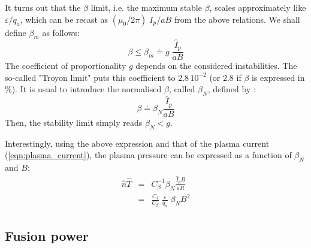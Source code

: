 It turns out that the $\beta$ limit, i.e. the maximum stable $\beta$, scales approximately like $\varepsilon/q_a$, which can be recast as $(\mu_0/2\pi)\; I_p/aB$ from the above relations. We shall define $\beta_m$ as follows:
\begin{equation}
  \beta \leqslant \beta_m \doteq g\; \frac{\hat I_p}{a B}
\end{equation}
The coefficient of proportionality $g$ depends on the considered instabilities. The so-called "Troyon limit" \cite{Troyon1984} puts this coefficient to $2.8\, 10^{-2}$ (or 2.8 if $\beta$ is expressed in $\%$).
It is usual to introduce the normalised $\beta$, called $\beta_N$, defined by \cite[eq.(13.146)]{Freidberg2007}:
\begin{equation}
    \beta \doteq \beta_N \frac{\hat I_p}{a B}
\end{equation}
Then, the stability limit simply reads $\beta_N <g$.

Interestingly, using the above expression and that of the plasma current (\ref{eqn:plasma_current}), the plasma pressure can be expressed as a function of $\beta_N$ and $B$:
\begin{eqnarray}
  \hat n\hat T &=& C_\beta^{-1} \beta_N \frac{\hat I_p B}{\varepsilon R} \nonumber \\
    &=& \frac{C_I}{C_\beta}\; \frac{\varepsilon}{q_a} \;  \beta_N B^2
  \label{eqn:nT_betaN}
\end{eqnarray}

\subsection{Fusion power}

